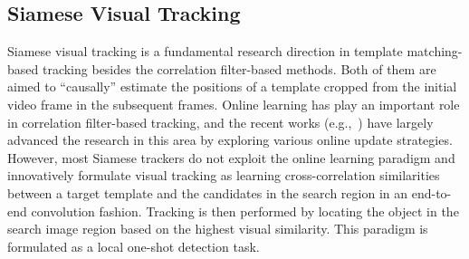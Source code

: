 \documentclass[journal]{IEEEtran}
\newcommand{\eg}{e.g.}
\renewcommand{\uline}{}
\begin{document}
\subsection{Siamese Visual Tracking}

Siamese visual tracking is a fundamental research direction in template matching-based tracking besides the correlation filter-based methods. Both of them are aimed to ``causally'' estimate the positions of a template cropped from the initial video frame in the subsequent frames. Online learning has play an important role in correlation filter-based tracking, and the recent works (\eg,~\cite{AutoTrack, 9376997, 9132673}) have largely \uline{advanced} the research in this area by exploring various online update strategies. However, most Siamese trackers do not exploit the online learning paradigm and innovatively formulate visual tracking as learning cross-correlation similarities between a target template and the candidates in the search region in an end-to-end convolution fashion. Tracking is then performed by locating the object in the search image region based on the highest visual similarity. This paradigm is formulated as a local one-shot detection task.
\end{document}
